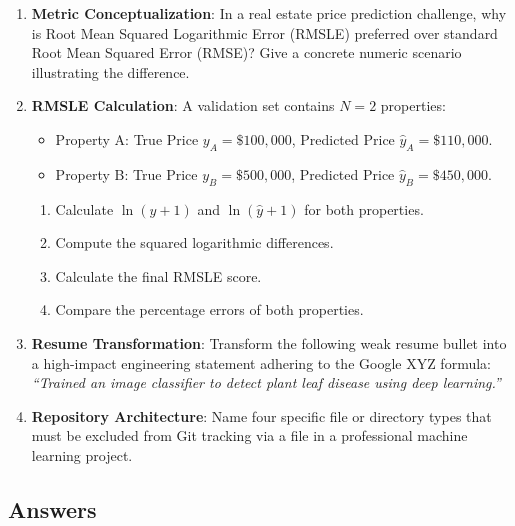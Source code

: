 \begin{checkyourself}
\begin{enumerate}
    \item \textbf{Metric Conceptualization}: In a real estate price prediction challenge, why is Root Mean Squared Logarithmic Error (RMSLE) preferred over standard Root Mean Squared Error (RMSE)? Give a concrete numeric scenario illustrating the difference.
    \item \textbf{RMSLE Calculation}: A validation set contains $N = 2$ properties:
    \begin{itemize}
        \item Property A: True Price $y_A = \$100{,}000$, Predicted Price $\hat{y}_A = \$110{,}000$.
        \item Property B: True Price $y_B = \$500{,}000$, Predicted Price $\hat{y}_B = \$450{,}000$.
    \end{itemize}
    \begin{enumerate}
        \item Calculate $\ln(y + 1)$ and $\ln(\hat{y} + 1)$ for both properties.
        \item Compute the squared logarithmic differences.
        \item Calculate the final RMSLE score.
        \item Compare the percentage errors of both properties.
    \end{enumerate}
    \item \textbf{Resume Transformation}: Transform the following weak resume bullet into a high-impact engineering statement adhering to the Google XYZ formula: \emph{``Trained an image classifier to detect plant leaf disease using deep learning.''}
    \item \textbf{Repository Architecture}: Name four specific file or directory types that must be excluded from Git tracking via a  file in a professional machine learning project.
\end{enumerate}
\end{checkyourself}

\subsection*{Answers}

